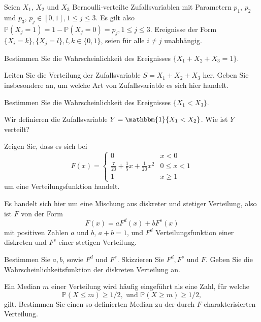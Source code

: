 \begin{Problem}
	Seien $X_1$, $X_2$ und $X_3$ Bernoulli-verteilte Zufallsvariablen mit Parametern $p_1$, $p_2$ und $p_3$, $p_j \in [0, 1], 1 \le j \le 3$. Es gilt also $\mathbb{P}(X_j = 1) = 1 - \mathbb{P}(X_j = 0) = p_j , 1 \le j \le 3$. Ereignisse der Form $\{X_i = k\}, \{X_j = l\}, l, k \in \{0, 1\}$, seien für alle $i \neq j$ unabhängig.
	\begin{parts}
		\item Bestimmen Sie die Wahrscheinlichkeit des Ereignisses $\{X_1 + X_2 + X_3 = 1\}$.
		\item Leiten Sie die Verteilung der Zufallsvariable $S = X_1 +X_2 +X_3$ her. Geben Sie insbesondere an, um welche Art von Zufallsvariable es sich hier handelt.
		\item Bestimmen Sie die Wahrscheinlichkeit des Ereignisses $\{X_1 < X_3\}$.
		\item Wir definieren die Zufallsvariable $Y = \mathbbm{1}\{X_1 < X_2\}$. Wie ist $Y$ verteilt?
	\end{parts}
\end{Problem}

\begin{Problem}
	\begin{parts}
	\item Zeigen Sie, dass es sich bei
	\[F(x)=\begin{cases}
		0 & x < 0\\
		\frac{7}{20}+\frac{1}{5}x+\frac{1}{20}x^2 & 0 \le x < 1\\
		1 & x \ge 1
	\end{cases}\]
um eine Verteilungsfunktion handelt.
\item Es handelt sich hier um eine Mischung aus diskreter und stetiger Verteilung, also ist $F$ von der Form
\[F(x)=a F^d(x)+b F^s(x)\]
mit positiven Zahlen $a$ und $b$, $a+b=1$, und $F^d$ Verteilungsfunktion einer diskreten und $F^s$ einer stetigen Verteilung.

Bestimmen Sie $a,b$, sowie $F^d$ und $F^s$. Skizzieren Sie $F^d, F^s$ und $F$. Geben Sie die Wahrscheinlichkeitsfunktion der diskreten Verteilung an.
\item Ein Median $m$ einer Verteilung wird häufig eingeführt als eine Zahl, für welche
\[\mathbb{P}(X\le m)\ge 1/2,\text{ und }\mathbb{P}(X\ge m)\ge 1/2,\]
gilt. Bestimmen Sie einen so definierten Median zu der durch $F$ charakterisierten Verteilung.
\end{parts}
\end{Problem}